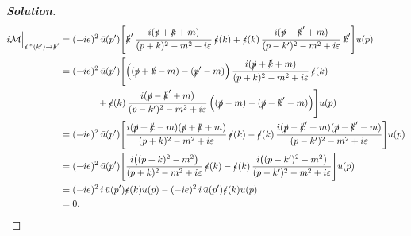 \documentclass[11pt]{article}
\newenvironment{solution}[1][]{\begin{proof}[\textbf{Solution}]}{\end{proof}}
\begin{document}
\begin{solution}[14.2]
	\begin{align*}
		i\mathcal M\Big|_{\slashed\epsilon^{\,*}(k')\to\slashed k'}
		&=(-ie)^2\,\bar u(p')\Bigg[
		\slashed k'\,
		\frac{i(\slashed p+\slashed k+m)}{(p+k)^2-m^2+i\varepsilon}\,
		\slashed\epsilon(k)
		+\slashed\epsilon(k)\,
		\frac{i(\slashed p-\slashed k'+m)}{(p-k')^2-m^2+i\varepsilon}\,
		\slashed k'
		\Bigg]u(p)
		\\
		&=(-ie)^2\,\bar u(p')\Bigg[
		\Big((\slashed p+\slashed k-m)-(\slashed p'-m)\Big)\,
		\frac{i(\slashed p+\slashed k+m)}{(p+k)^2-m^2+i\varepsilon}\,
		\slashed\epsilon(k)
		\\
		&\qquad\qquad
		+\slashed\epsilon(k)\,
		\frac{i(\slashed p-\slashed k'+m)}{(p-k')^2-m^2+i\varepsilon}\,
		\Big((\slashed p-m)-(\slashed p-\slashed k'-m)\Big)
		\Bigg]u(p)
		\\
		&=(-ie)^2\,\bar u(p')\Bigg[
		\frac{i(\slashed p+\slashed k-m)(\slashed p+\slashed k+m)}{(p+k)^2-m^2+i\varepsilon}\,
		\slashed\epsilon(k)
		-\slashed\epsilon(k)\,
		\frac{i(\slashed p-\slashed k'+m)(\slashed p-\slashed k'-m)}{(p-k')^2-m^2+i\varepsilon}
		\Bigg]u(p)
		\\
		&=(-ie)^2\,\bar u(p')\Bigg[
		\frac{i\big((p+k)^2-m^2\big)}{(p+k)^2-m^2+i\varepsilon}\,
		\slashed\epsilon(k)
		-\slashed\epsilon(k)\,
		\frac{i\big((p-k')^2-m^2\big)}{(p-k')^2-m^2+i\varepsilon}
		\Bigg]u(p)
		\\
		&=(-ie)^2\,i\,\bar u(p')\slashed\epsilon(k)u(p)
		-(-ie)^2\,i\,\bar u(p')\slashed\epsilon(k)u(p)
		\\
		&=0.
	\end{align*}
\end{solution}
\end{document}

